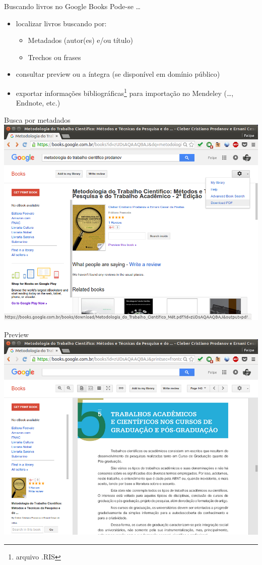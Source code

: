 \documentclass{beamer}
\begin{document}
\begin{frame}{Buscando livros no Google Books}
  Pode-se \ldots
  \begin{itemize}
  \item localizar livros buscando por:
    \begin{itemize}
    \item Metadados (autor(es) e/ou título)
    \item Trechos ou frases
    \end{itemize}
  \item consultar preview ou a íntegra (se disponível em domínio
    público)
  \item \alert{exportar} informações bibliográficas\footnote{arquivo
      .RIS} para \alert{importação} no Mendeley (\ldots, Endnote,
    etc.)
  \end{itemize}
\end{frame}

\begin{frame}{Busca por metadados}
  \includegraphics[height=.85\textheight]{Busca/gbooks-livro}

\end{frame}

\begin{frame}{Preview}
  \includegraphics[height=.85\textheight]{Busca/gbooks-preview}
\end{frame}
\end{document}
